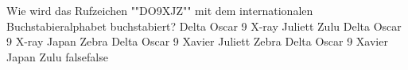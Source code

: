    {Wie wird das Rufzeichen ""DO9XJZ"" mit dem internationalen Buchstabieralphabet  buchstabiert?}
    {Delta Oscar 9 X-ray Juliett Zulu}
    {Delta Oscar 9 X-ray Japan Zebra}
    {Delta Oscar 9 Xavier Juliett Zebra}
    {Delta Oscar 9 Xavier Japan Zulu}
    {false}{false}